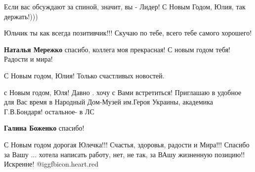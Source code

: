 \begin{itemize}
Если вас обсуждают за спиной, значит, вы - Лидер! С Новым Годом, Юлия, так держать!)))

Юльчик ты как всегда позитивчик!!! Скучаю по тебе, всего тебе самого хорошего!

\begin{itemize} %
\textbf{Наталья Мережко} спасибо, коллега моя прекрасная! С новым годом тебя! Радости и мира!
\end{itemize} %

С Новым годом, Юлия!
Только счастливых новостей.


с Новым годом, Юля! Давно . хочу с Вами встретиться! Приглашаю в удобное для
Вас время в Народный Дом-Музей им.Героя Украины, академика Г.В.Бондаря!
остальное- в ЛС

\textbf{Галина Боженко} спасибо!


С Новым годом дорогая Юлечка!!! Счастья, здоровья, радости и Мира!!! Спасибо за
Вашу ... хотела написать работу, нет, не так, за ВАшу жизненную позицию!!
Искренне! @igg{fbicon.heart.red}

\end{itemize} %
